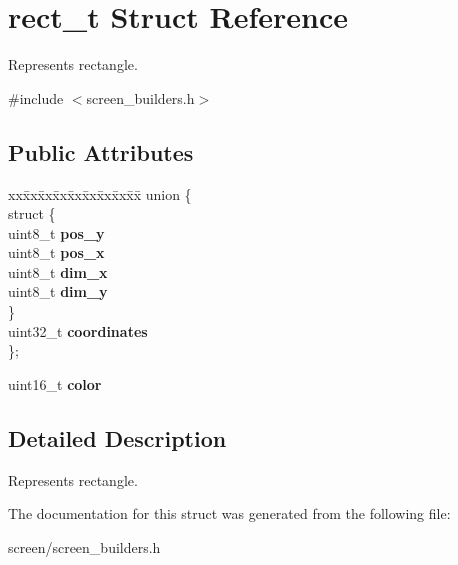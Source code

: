 \hypertarget{structrect__t}{}\section{rect\+\_\+t Struct Reference}
\label{structrect__t}


Represents rectangle.  




{\ttfamily \#include $<$screen\+\_\+builders.\+h$>$}

\subsection*{Public Attributes}
\begin{DoxyCompactItemize}
\item 
\begin{tabbing}
xx\=xx\=xx\=xx\=xx\=xx\=xx\=xx\=xx\=\kill
union \{\\
\>struct \{\\
\>\>uint8\_t {\bfseries pos\_y}\\
\>\>uint8\_t {\bfseries pos\_x}\\
\>\>uint8\_t {\bfseries dim\_x}\\
\>\>uint8\_t {\bfseries dim\_y}\\
\>\} \hypertarget{unionrect__t_1_1_0D0_a34578aae7e13b42bed9af43d8fbd9b6d}{}\label{unionrect__t_1_1_0D0_a34578aae7e13b42bed9af43d8fbd9b6d}
\\
\>uint32\_t {\bfseries coordinates}\\
\}; \hypertarget{structrect__t_ab7ac2353c9d253ec2db3a9d98ea8513a}{}\label{structrect__t_ab7ac2353c9d253ec2db3a9d98ea8513a}
\\

\end{tabbing}\item 
uint16\+\_\+t {\bfseries color}\hypertarget{structrect__t_ac1d4fbec669e6cb07a0e2892f6b642df}{}\label{structrect__t_ac1d4fbec669e6cb07a0e2892f6b642df}

\end{DoxyCompactItemize}


\subsection{Detailed Description}
Represents rectangle. 

The documentation for this struct was generated from the following file\+:\begin{DoxyCompactItemize}
\item 
screen/screen\+\_\+builders.\+h\end{DoxyCompactItemize}

